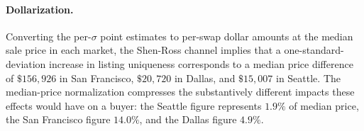 \paragraph{Dollarization.} Converting the per-$\sigma$ point estimates
to per-swap dollar amounts at the median sale price in each market,
the Shen-Ross channel implies that a one-standard-deviation increase
in listing uniqueness corresponds to a median price difference of
$\$156{,}926$ in San Francisco, $\$20{,}720$ in Dallas, and $\$15{,}007$
in Seattle. The median-price normalization compresses the
substantively different impacts these effects would have on a buyer:
the Seattle figure represents $1.9\%$ of median price, the San
Francisco figure $14.0\%$, and the Dallas figure $4.9\%$.
